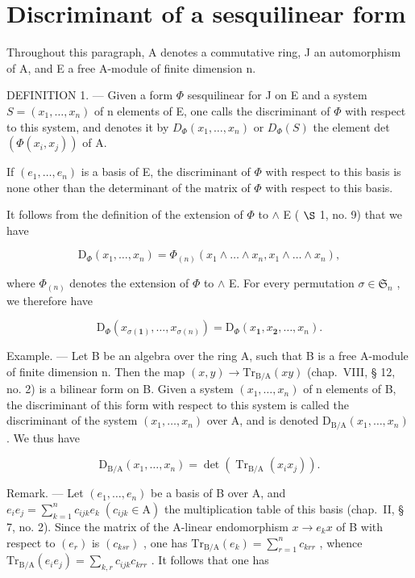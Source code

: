 \section{Discriminant of a sesquilinear form}

Throughout this paragraph, A denotes a commutative ring, J an automorphism of A, and E a free A-module of finite dimension n.

DEFINITION 1. --- Given a form \(\Phi\) sesquilinear for J on E and a system \(S = (x_1, \ldots, x_n)\) of n elements of E, one calls the discriminant of \(\Phi\) with respect to this system, and denotes it by \(D_{\Phi}(x_1, \ldots, x_n)\) or \(D_{\Phi}(S)\) the element det \((\Phi(x_i, x_j))\) of A.

If \((e_{1},\ldots,e_{n})\) is a basis of E, the discriminant of \(\Phi\) with respect to this basis is none other than the determinant of the matrix of \(\Phi\) with respect to this basis.

It follows from the definition of the extension of \(\Phi\) to \(\wedge\) E ( \(\S\) 1, no. 9) that we have

\[
\mathrm{D} _ {\Phi} (x _ {1}, \dots , x _ {n}) = \Phi_ {(n)} (x _ {1} \wedge \dots \wedge x _ {n}, x _ {1} \wedge \dots \wedge x _ {n}),\tag{1}
\]

where \(\Phi_{(n)}\) denotes the extension of \(\Phi\) to \(\wedge\) E. For every permutation \(\sigma \in \mathfrak{S}_n\) , we therefore have

\[
\mathrm{D} _ {\Phi} (x _ {\sigma (\mathbf {1})}, \dots , x _ {\sigma (n)}) = \mathrm{D} _ {\Phi} (x _ {\mathbf {1}}, x _ {\mathbf {2}}, \dots , x _ {n}).
\]

Example. --- Let B be an algebra over the ring A, such that B is a free A-module of finite dimension n. Then the map \((x, y) \to \mathrm{Tr}_{\mathrm{B}/\mathrm{A}}(xy)\) (chap.~VIII, § 12, no. 2) is a bilinear form on B. Given a system \((x_{1}, \ldots, x_{n})\) of n elements of B, the discriminant of this form with respect to this system is called the discriminant of the system \((x_{1}, \ldots, x_{n})\) over A, and is denoted \(\mathrm{D}_{\mathrm{B}/\mathrm{A}}(x_{1}, \ldots, x_{n})\) . We thus have

\[
\mathrm{D} _ {\mathrm{B/A}} (x _ {1}, \dots , x _ {n}) = \det (\operatorname{Tr} _ {\mathrm{B/A}} (x _ {i} x _ {j})).\tag{2}
\]

Remark. --- Let \((e_{1},\ldots,e_{n})\) be a basis of B over A, and \(e_{i}e_{j}=\sum_{k=1}^{n}c_{ijk}e_{k}\;(c_{ijk}\in\mathrm{A})\) the multiplication table of this basis (chap.~II, § 7, no. 2). Since the matrix of the A-linear endomorphism \(x\to e_{k}x\) of B with respect to \((e_{r})\) is \((c_{ksr})\) , one has \(\mathrm{Tr}_{\mathrm{B}/\mathrm{A}}(e_{k})=\sum_{r=1}^{n}c_{krr}\) , whence \(\mathrm{Tr}_{\mathrm{B}/\mathrm{A}}(e_{i}e_{j})=\sum_{k,r}c_{ijk}c_{krr}\) . It follows that one has


